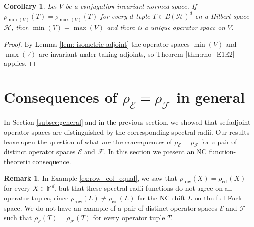 \documentclass[12pt]{amsart}
\numberwithin{equation}{section}
\newtheorem{corollary}[theorem]{Corollary}
\theoremstyle{definition}
\newtheorem{remark}[theorem]{Remark}
\newcommand{\cE}{\mathcal{E}}
\newcommand{\cF}{\mathcal{F}}
\newcommand{\cH}{\mathcal{H}}
\newcommand{\bM}{\mathbb{M}}
\begin{document}
\begin{corollary}\label{cor:rho_Vmax_Vmin}
    Let $V$ be a conjugation invariant normed space. If $\rho_{\min(V)}(T) = \rho_{\max(V)}(T)$ for every $d$-tuple $T \in B(\cH)^d$ on a Hilbert space $\cH$, then $\min(V) = \max(V)$ and there is a unique operator space on $V$. 
\end{corollary}
\begin{proof}
    By Lemma \ref{lem: isometric adjoint} the operator spaces $\min(V)$ and $\max(V)$ are invariant under taking adjoints, so Theorem \ref{thm:rho_E1E2} applies.
\end{proof}








\section{Consequences of \texorpdfstring{$\rho_{\cE} = \rho_{\cF}$}{rhoE = rhoF} in general}\label{sec:rho_E_F}

In Section \ref{subsec:general} and in the previous section, we showed that selfadjoint operator spaces are distinguished by the corresponding spectral radii. 
Our results leave open the question of what are the consequences of $\rho_{\cE} = \rho_{\cF}$ for a pair of distinct operator spaces $\cE$ and $\cF$. 
In this section we present an NC function-theoretic consequence. 

\begin{remark}\label{rem:row_col}
    In Example \ref{ex:row_col_equal}, we saw that $\rho_{\operatorname{row}}(X) = \rho_{\operatorname{col}}(X)$ for every $X \in \bM^d$, but that these spectral radii functions do not agree on all operator tuples, since $\rho_{\operatorname{row}}(L) \neq \rho_{\operatorname{col}}(L)$ for the NC shift $L$ on the full Fock space. 
    We do not have an example of a pair of distinct operator spaces $\cE$ and $\cF$ such that $\rho_{\cE}(T) = \rho_{\cF}(T)$ for every operator tuple $T$. 
\end{remark}
\end{document}

